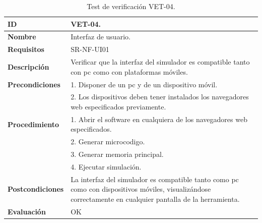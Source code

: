\begin{center}
\begin{table}[htb]
\centering
\caption{Test de verificación VET-04.}
\begin{tabular}{@{}p{2.5cm} p{13cm}@{}} 
\toprule
\textbf{ID} 					& VET-04. \\
\midrule
\textbf{Nombre} 				& Interfaz de usuario. \\
\midrule
\textbf{Requisitos} 		& SR-NF-UI01\\
\midrule
\textbf{Descripción} 		& Verificar que la interfaz del simulador es compatible tanto con \acrshort{pc} como con plataformas móviles. \\
\midrule
\textbf{Precondiciones}		& 1. Disponer de un \acrshort{pc} y de un dispositivo móvil. \\
											& 2. Los dispositivos deben tener instalados los navegadores web especificados previamente. \\
\midrule
\textbf{Procedimiento}			& 1. Abrir el \gls{software} en cualquiera de los navegadores web especificados. \\
							& 2. Generar \gls{microcodigo}.\\
							& 3. Generar memoria principal.\\
							& 4. Ejecutar simulación.\\
\midrule
\textbf{Postcondiciones} 		&  La interfaz del simulador es compatible tanto como \acrshort{pc} como con dispositivos móviles, visualizándose correctamente en cualquier pantalla de la herramienta.\\
\midrule
\textbf{Evaluación} 			& OK \\
\bottomrule
\end{tabular}
\label{tab:vet04}
\end{table}
\end{center}

